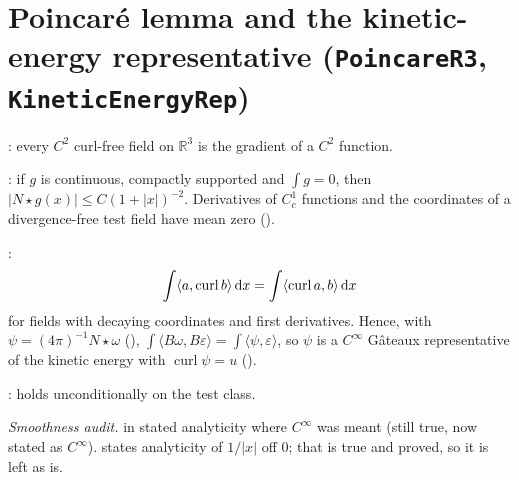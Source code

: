 \documentclass[11pt]{article}
\begin{document}
\section{Poincar\'e lemma and the kinetic-energy representative (\texttt{PoincareR3}, \texttt{KineticEnergyRep})}
\begin{theorem}\coined: every $C^2$ curl-free field on $\mathbb{R}^3$ is the gradient of a $C^2$ function.\end{theorem}
\begin{theorem}\coined: if $g$ is continuous, compactly supported and $\int g=0$, then $|N\star g(x)|\le C(1+|x|)^{-2}$. Derivatives of $C^1_c$ functions and the coordinates of a divergence-free test field have mean zero (\coined).\end{theorem}
\begin{theorem}\coined: \[\int\langle a,\operatorname{curl} b\rangle\,\mathrm{d} x=\int\langle\operatorname{curl} a,b\rangle\,\mathrm{d} x\]for fields with decaying coordinates and first derivatives. Hence, with $\psi=(4\pi)^{-1}N\star\omega$ (\coined), $\int\langle B\omega,B\varepsilon\rangle=\int\langle\psi,\varepsilon\rangle$, so $\psi$ is a $C^\infty$ G\^ateaux representative of the kinetic energy with $\operatorname{curl}\psi=u$ (\coined).\end{theorem}
\begin{theorem}\coined:  holds unconditionally on the test class.\end{theorem}
\noindent\emph{Smoothness audit.}  in  stated analyticity where $C^\infty$ was meant (still true, now stated as $C^\infty$).  states analyticity of $1/|x|$ off $0$; that is true and proved, so it is left as is.
\end{document}
